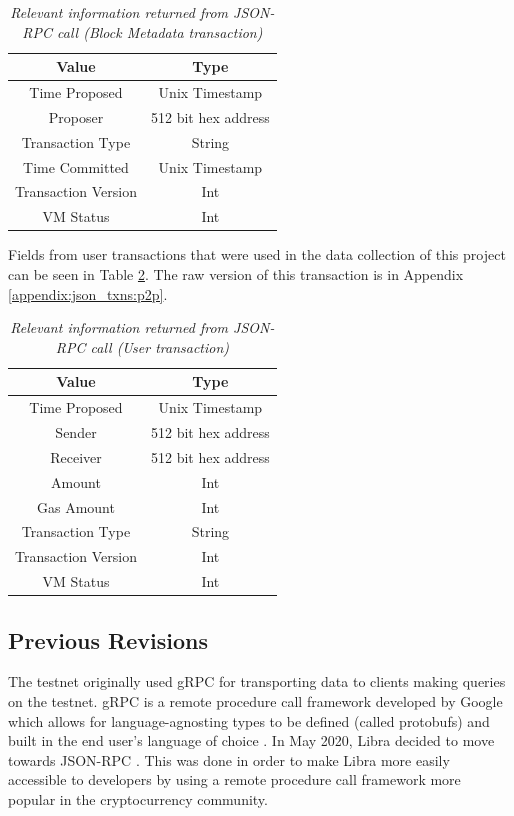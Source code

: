 \documentclass[12pt,openany,a4paper]{book}
\begin{document}
\begin{table}[h!]
    \caption{\sl Relevant information returned from JSON-RPC call (Block Metadata transaction)}
    \label{bm_datatypes_table}
\begin{center}
\begin{tabular}{ |c|c| } 
    \hline
    Value & Type \\
    \hline
    Time Proposed & Unix Timestamp \\
    Proposer & 512 bit hex address \\
    Transaction Type & String \\
    Time Committed & Unix Timestamp \\
    Transaction Version & Int \\
    VM Status & Int \\
    \hline
\end{tabular}
\end{center}
\end{table}

Fields from user transactions that were used in the data collection of this project 
can be seen in Table \ref{tx_datatypes_table}. The raw version of this transaction is 
in Appendix \ref{appendix:json_txns:p2p}.

\begin{table}[h!]
    \caption{\sl Relevant information returned from JSON-RPC call (User transaction)}
    \label{tx_datatypes_table}
\begin{center}
\begin{tabular}{ |c|c| } 
    \hline
    Value & Type \\
    \hline
    Time Proposed & Unix Timestamp \\
    Sender & 512 bit hex address \\
    Receiver & 512 bit hex address \\
    Amount & Int \\
    Gas Amount & Int \\
    Transaction Type & String \\
    Transaction Version & Int \\
    VM Status & Int \\
    \hline
\end{tabular}
\end{center}
\end{table}

\subsection{Previous Revisions}
The testnet originally used gRPC \cite{grpc} for transporting data to clients making 
queries on the testnet. gRPC is a remote procedure call framework developed by Google which allows for 
language-agnosting types to be defined (called protobufs) and built in the end
user's language of choice \cite{grpc_detail}. 
In May 2020, Libra decided to move towards JSON-RPC \cite{libra_jsonrpc}. This was done in 
order to make Libra more easily accessible to developers by using a remote procedure call 
framework more popular in the cryptocurrency community.
\end{document}
